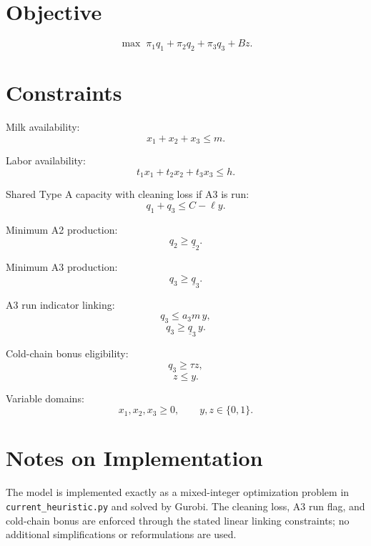 \section*{Objective}
\[
\max \; \pi_1 q_1+\pi_2 q_2+\pi_3 q_3+Bz.
\]

\section*{Constraints}
Milk availability:
\[
x_1+x_2+x_3 \le m.
\]

Labor availability:
\[
t_1x_1+t_2x_2+t_3x_3 \le h.
\]

Shared Type A capacity with cleaning loss if A3 is run:
\[
q_1+q_3 \le C-\ell y.
\]

Minimum A2 production:
\[
q_2 \ge \underline{q}_2.
\]

Minimum A3 production:
\[
q_3 \ge \underline{q}_3.
\]

A3 run indicator linking:
\[
q_3 \le a_3 m\, y,
\]
\[
q_3 \ge \underline{q}_3\, y.
\]

Cold-chain bonus eligibility:
\[
q_3 \ge \tau z,
\]
\[
z \le y.
\]

Variable domains:
\[
x_1,x_2,x_3\ge 0,\qquad y,z\in\{0,1\}.
\]

\section*{Notes on Implementation}
The model is implemented exactly as a mixed-integer optimization problem in \texttt{current\_heuristic.py} and solved by Gurobi. The cleaning loss, A3 run flag, and cold-chain bonus are enforced through the stated linear linking constraints; no additional simplifications or reformulations are used.

